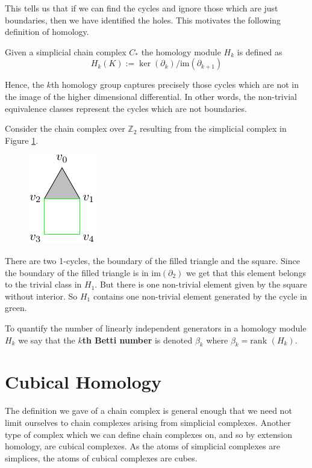 This tells us that if we can find the cycles and ignore those which are just boundaries, then we have identified the holes. This motivates the following definition of homology.
\begin{definition}
  Given a simplicial chain complex \hspace{0.05cm}$C_{*}$ the homology module $H_{k}$ is defined as
  \[H_{k}(K) := \ker(\partial_{k})/\text{im}(\partial_{k+1})\]
\end{definition}
Hence, the $k$th homology group captures precisely those cycles which are not in the image of the higher dimensional differential. In other words, the non-trivial equivalence classes represent the cycles which are not boundaries.
\begin{example}
Consider the chain complex over $\mathbb{Z}_{2}$ resulting from the simplicial complex in Figure \ref{trihom}.
\begin{figure}[ht]
  \centering
  \includegraphics[scale=2]{trisquarefilled.pdf}
  \caption{\label{trihom} }
\end{figure}
There are two 1-cycles, the boundary of the filled triangle and the square. Since the boundary of the filled triangle is in $\text{im} (\partial_{2})$ we get that this element belongs to the trivial class in $H_{1}$. But there is one non-trivial element given by the square without interior. So $H_{1}$ contains one non-trivial element generated by the cycle in green.

To quantify the number of linearly independent generators in a homology module $H_{k}$ we say that the \textbf{$k$th Betti number} is denoted $\beta_{k}$ where $\beta_{k} = \text{rank }(H_{k})$.

\section{Cubical Homology}
The definition we gave of a chain complex is general enough that we need not limit ourselves to chain complexes arising from simplicial complexes. Another type of complex which we can define chain complexes on, and so by extension homology, are cubical complexes. As the atoms of simplicial complexes are simplices, the atoms of cubical complexes are cubes.


\end{example}
